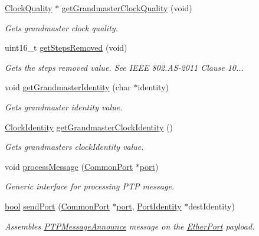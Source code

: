 \begin{DoxyCompactItemize}
\hyperlink{struct_clock_quality}{Clock\+Quality} $\ast$ \hyperlink{class_p_t_p_message_announce_a4f7214e53f1413e39314947d39115809}{get\+Grandmaster\+Clock\+Quality} (void)
\begin{DoxyCompactList}\small\item\em Gets grandmaster clock quality. \end{DoxyCompactList}\item 
uint16\+\_\+t \hyperlink{class_p_t_p_message_announce_a54d21c15ac1d26983b50a68c3de7e1da}{get\+Steps\+Removed} (void)
\begin{DoxyCompactList}\small\item\em Gets the steps removed value. See I\+E\+EE 802.\+AS-\/2011 Clause 10... \end{DoxyCompactList}\item 
void \hyperlink{class_p_t_p_message_announce_a8c30dedc349082deec06da1c0691f500}{get\+Grandmaster\+Identity} (char $\ast$identity)
\begin{DoxyCompactList}\small\item\em Gets grandmaster identity value. \end{DoxyCompactList}\item 
\hyperlink{class_clock_identity}{Clock\+Identity} \hyperlink{class_p_t_p_message_announce_aa9865dc21693b99907be1a5aa70aa8ae}{get\+Grandmaster\+Clock\+Identity} ()
\begin{DoxyCompactList}\small\item\em Gets grandmaster\textquotesingle{}s clock\+Identity value. \end{DoxyCompactList}\item 
void \hyperlink{class_p_t_p_message_announce_a45670a42f5684252d52543f9ed3a1551}{process\+Message} (\hyperlink{class_common_port}{Common\+Port} $\ast$\hyperlink{gst__avb__playbin_8c_a63c89c04d1feae07ca35558055155ffb}{port})
\begin{DoxyCompactList}\small\item\em Generic interface for processing P\+TP message. \end{DoxyCompactList}\item 
\hyperlink{avb__gptp_8h_af6a258d8f3ee5206d682d799316314b1}{bool} \hyperlink{class_p_t_p_message_announce_ab6f43fa7d50a13391867209c8a0fca16}{send\+Port} (\hyperlink{class_common_port}{Common\+Port} $\ast$\hyperlink{gst__avb__playbin_8c_a63c89c04d1feae07ca35558055155ffb}{port}, \hyperlink{class_port_identity}{Port\+Identity} $\ast$dest\+Identity)
\begin{DoxyCompactList}\small\item\em Assembles \hyperlink{class_p_t_p_message_announce}{P\+T\+P\+Message\+Announce} message on the \hyperlink{class_ether_port}{Ether\+Port} payload. \end{DoxyCompactList}\item 

\end{DoxyCompactItemize}
